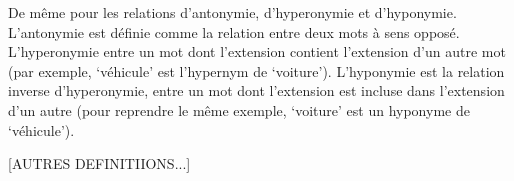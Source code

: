 De même pour les relations d'antonymie, d'hyperonymie et d'hyponymie. 
L'antonymie est définie comme la relation entre deux mots à sens opposé. 
L'hyperonymie entre un mot dont l'extension contient l'extension d'un autre mot 
(par exemple, `véhicule' est l'hypernym de `voiture'). L'hyponymie est la 
relation inverse d'hyperonymie, entre un mot dont l'extension est incluse dans 
l'extension d'un autre (pour reprendre le même exemple, `voiture' est un 
hyponyme de `véhicule').

[AUTRES DEFINITIIONS...]
